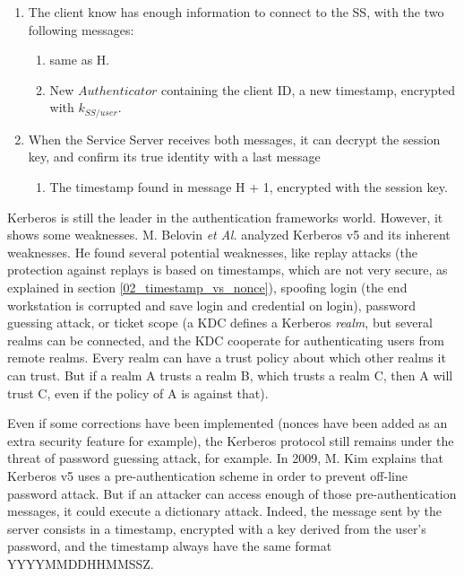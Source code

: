\begin{enumerate}
	\item The client know has enough information to connect to the SS, with the two following messages:
	\begin{enumerate}[label=\bfseries\Alph*), resume]
		\item same as H.
		\item New $Authenticator$ containing the client ID, a new timestamp, encrypted with $k_{SS/user}$.
	\end{enumerate}
	
	\item When the Service Server receives both messages, it can decrypt the session key, and confirm its true identity with a last message
	\begin{enumerate}[label=\bfseries\Alph*), resume]
		\item The timestamp found in message H + 1, encrypted with the session key.
	\end{enumerate}
\end{enumerate}

Kerberos is still the leader in the authentication frameworks world. However, it shows some weaknesses. M. Belovin \textit{et Al.} analyzed Kerberos v5\cite{Bellovin1990} and its inherent weaknesses. He found several potential weaknesses, like replay attacks (the protection against replays is based on timestamps, which are not very secure, as explained in section \ref{02_timestamp_vs_nonce}), spoofing login (the end workstation is corrupted and save login and credential on login), password guessing attack, or ticket scope (a KDC defines a Kerberos \textit{realm}, but several realms can be connected, and the KDC cooperate for authenticating users from remote realms. Every realm can have a trust policy about which other realms it can trust. But if a realm A trusts a realm B, which trusts a realm C, then A will trust C, even if the policy of A is against that).

Even if some corrections have been implemented (nonces have been added as an extra security feature for example), the Kerberos protocol still remains under the threat of password guessing attack, for example. In 2009, \cite{kim2009survey} M. Kim explains that Kerberos v5 uses a pre-authentication scheme in order to prevent off-line password attack. But if an attacker can access enough of those pre-authentication messages, it could execute a dictionary attack. Indeed, the message sent by the server consists in a timestamp, encrypted with a key derived from the user's password, and the timestamp always have the same format YYYYMMDDHHMMSSZ.

